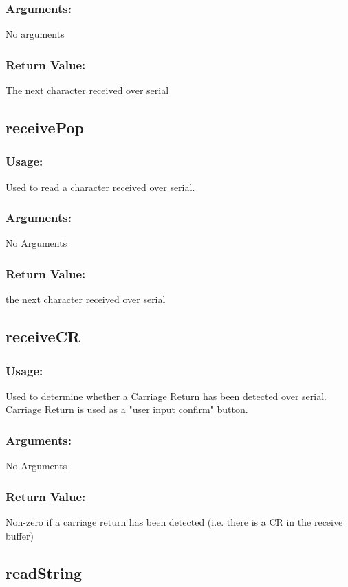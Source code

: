 \documentclass[]{report}
\begin{document}
\subsubsection{Arguments:}
No arguments

\subsubsection{Return Value:}
The next character received over serial

\subsection{receivePop}
\subsubsection{Usage:}
Used to read a character received over serial.

\subsubsection{Arguments:}
No Arguments

\subsubsection{Return Value:}
the next character received over serial

\subsection{receiveCR}
\subsubsection{Usage:}
Used to determine whether a Carriage Return has been detected over serial. Carriage Return is used as a "user input confirm" button.

\subsubsection{Arguments:}
No Arguments

\subsubsection{Return Value:}
Non-zero if a carriage return has been detected (i.e. there is a CR in the receive buffer)

\subsection{readString}
\end{document}
